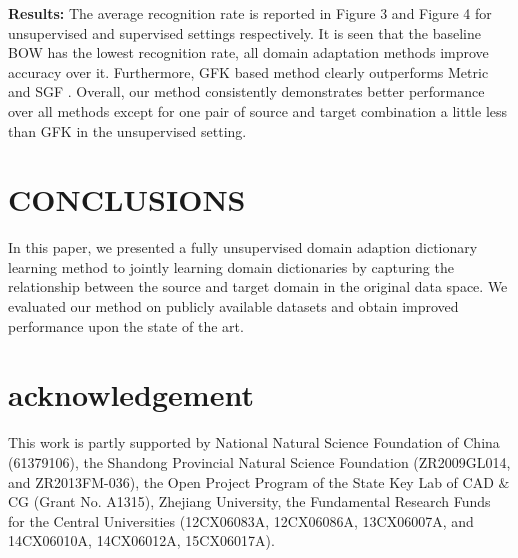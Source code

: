 \documentclass{article}
\begin{document}
\textbf{Results:} The average recognition rate is reported in Figure 3 and Figure 4 for unsupervised and supervised settings respectively. It is seen that the baseline BOW has the lowest recognition rate, all domain adaptation methods improve accuracy over it.  Furthermore, GFK \cite{gong2012geodesic} based method clearly outperforms Metric \cite{saenko2010adapting} and SGF \cite{gopalan2011domain}. Overall, our method consistently demonstrates better performance over all methods except for one pair of source and target combination a little less than GFK \cite{gong2012geodesic} in the unsupervised setting.
\section{CONCLUSIONS}
\label{sec:4}

In this paper, we presented a fully unsupervised domain adaption dictionary learning method to jointly learning domain dictionaries by capturing the relationship between the source and target domain in the original data space. We evaluated our method on publicly available datasets and obtain improved performance upon the state of the art.
\section{acknowledgement}
\label{sec:5}

This work is partly supported by National Natural Science Foundation of China (61379106), the Shandong Provincial Natural Science Foundation (ZR2009GL014, and ZR2013FM-036), the Open Project Program of the State Key Lab of CAD \(\&\) CG (Grant No. A1315), Zhejiang University, the Fundamental Research Funds for the Central Universities (12CX06083A, 12CX06086A, 13CX06007A, and 14CX06010A, 14CX06012A, 15CX06017A).






\label{sec:refs}




\end{document}
